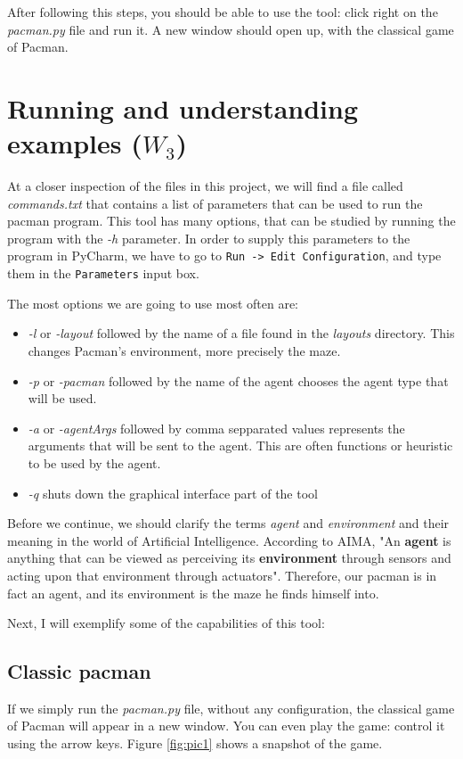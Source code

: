 \documentclass[a4paper,12pt]{report}
\begin{document}
After following this steps, you should be able to use the tool: click right on the \textit{pacman.py} file and run it. A new window should open up, with the classical game of Pacman.

\chapter{Running and understanding examples ($W_3$)}

At a closer inspection of the files in this project, we will find a file called \textit{commands.txt} that contains a list of parameters that can be used to run the pacman program. This tool has many options, that can be studied by running the program with the \textit{-h} parameter. In order to supply this parameters to the program in PyCharm, we have to go to \texttt{Run -> Edit Configuration}, and type them in the \texttt{Parameters} input box. 

The most options we are going to use most often are:

\begin{itemize}
	\item \textit{-l} or \textit{-layout} followed by the name of a file found in the \textit{layouts} directory. This changes Pacman's environment, more precisely the maze.
	\item \textit{-p} or \textit{-pacman} followed by the name of the agent chooses the agent type that will be used.
	\item \textit{-a} or \textit{-agentArgs} followed by comma sepparated values represents the arguments that will be sent to the agent. This are often functions or heuristic to be used by the agent.
	\item \textit{-q} shuts down the graphical interface part of the tool
\end{itemize}

Before we continue, we should clarify the terms \textit{agent} and \textit{environment} and their meaning in the world of Artificial Intelligence. According to AIMA, "An \textbf{agent} is anything that can be viewed as perceiving its \textbf{environment} through sensors and acting upon that environment through actuators"\cite{russell2016artificial}.
Therefore, our pacman is in fact an agent, and its environment is the maze he finds himself into. 

Next, I will exemplify some of the capabilities of this tool:

\section{Classic pacman}
If we simply run the \textit{pacman.py} file, without any configuration, the classical game of Pacman will appear in a new window. You can even play the game: control it using the arrow keys.  Figure \ref{fig:pic1} shows a snapshot of the game.
\end{document}
